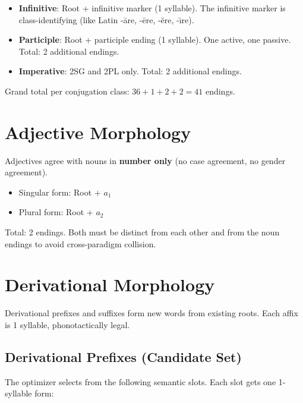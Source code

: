 \documentclass[12pt]{book}
\begin{document}
\begin{itemize}
  \item \textbf{Infinitive}: Root + infinitive marker (1 syllable).
        The infinitive marker is class-identifying (like Latin -\={a}re,
        -\={e}re, -\u{e}re, -\={\i}re).
  \item \textbf{Participle}: Root + participle ending (1 syllable).
        One active, one passive. Total: 2 additional endings.
  \item \textbf{Imperative}: 2SG and 2PL only. Total: 2 additional endings.
\end{itemize}

\noindent Grand total per conjugation class: $36 + 1 + 2 + 2 = 41$ endings.


\section{Adjective Morphology}

Adjectives agree with nouns in \textbf{number only} (no case agreement,
no gender agreement).

\begin{itemize}
  \item Singular form: Root + $a_1$
  \item Plural form: Root + $a_2$
\end{itemize}

\noindent Total: 2 endings. Both must be distinct from each other and from
the noun endings to avoid cross-paradigm collision.


\section{Derivational Morphology}
\label{sec:derivation}

Derivational prefixes and suffixes form new words from existing roots.
Each affix is 1 syllable, phonotactically legal.

\subsection{Derivational Prefixes (Candidate Set)}

The optimizer selects from the following semantic slots. Each slot gets
one 1-syllable form:
\end{document}
